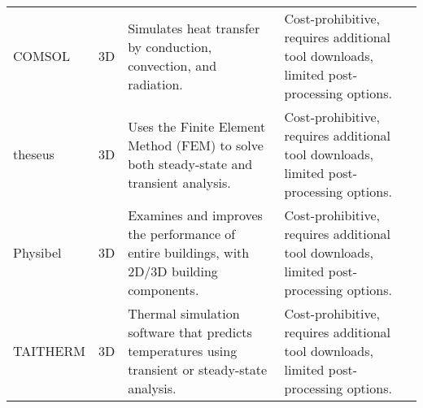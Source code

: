 \begin{table}[htb]
\begin{tabular}{p{2cm}p{0.75cm}p{5.0cm}p{5.0cm}}
        COMSOL     & 3D    & Simulates heat transfer by conduction, convection, and radiation.  & Cost-prohibitive, requires additional tool downloads, limited post-processing options. \cite{COMSOL} \\
        
        theseus    & 3D    & Uses the Finite Element Method (FEM) to solve both steady-state and transient analysis.  & Cost-prohibitive, requires additional tool downloads, limited post-processing options. \cite{thes} \\
        
        Physibel   & 3D    & Examines and improves the performance of entire buildings, with 2D/3D building components.  & Cost-prohibitive, requires additional tool downloads, limited post-processing options. \cite{phys} \\
        
        TAITHERM   & 3D    & Thermal simulation software that predicts temperatures using transient or steady-state analysis.  & Cost-prohibitive, requires additional tool downloads, limited post-processing options. \cite{taitherm} \\
        
        \bottomrule
    \end{tabular}
\end{table}












